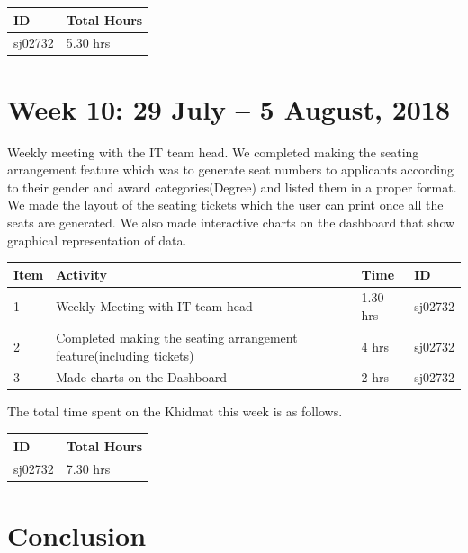 \documentclass{article}
\begin{document}
\begin{tabular}{|l|l|}
  \hline
  ID & Total Hours\\\hline\hline
  sj02732 & 5.30 hrs\\\hline
\end{tabular}

\newpage %
\section*{Week 10: 29 July -- 5 August, 2018}

Weekly meeting with the IT team head. We completed making the seating arrangement feature which was to generate seat numbers to applicants according to their gender and award categories(Degree) and listed them in a proper format. We made the layout of the seating tickets which the user can print once all the seats are generated. We also made interactive charts on the dashboard that show graphical representation of data.   \newline

\begin{tabular}{|l|l|l|l|}
  \hline
  Item 	& Activity & Time & ID \\\hline\hline
  1	& Weekly Meeting with IT team head & 1.30 hrs & sj02732 \\\hline
  2	& Completed making the seating arrangement feature(including tickets)  & 4 hrs & sj02732 \\\hline
  3	& Made charts on the Dashboard & 2 hrs & sj02732 \\\hline
\end{tabular}
\newline
The total time spent on the Khidmat this week is as follows.

\begin{tabular}{|l|l|}
  \hline
  ID & Total Hours\\\hline\hline
  sj02732 & 7.30 hrs\\\hline
\end{tabular}

\newpage
\section*{Conclusion}
\end{document}
